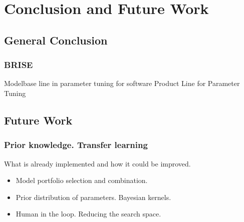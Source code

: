 \chapter{Conclusion and Future Work}
    \section{General Conclusion}
        \subsection{BRISE}
        Modelbase line in parameter tuning for software Product Line for Parameter Tuning
    \section{Future Work}
        \subsection{Prior knowledge. Transfer learning}
         What is already implemented and how it could be improved.
         \begin{itemize}
             \item Model portfolio selection and combination.
             \item Prior distribution of parameters. Bayesian kernels.
             \item Human in the loop. Reducing the search space.
         \end{itemize}